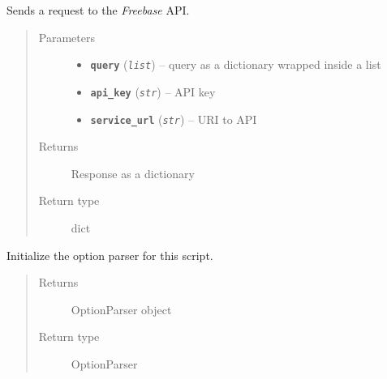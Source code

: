 \documentclass[letterpaper,10pt,english]{sphinxmanual}
\begin{document}

\begin{fulllineitems}
\label{src.prep.relations:src.prep.relations.relations.freebase_request}
Sends a request to the \emph{Freebase} API.
\begin{quote}\begin{description}
\item[{Parameters}] \leavevmode\begin{itemize}
\item {} 
\textbf{\texttt{query}} (\emph{\texttt{list}}) --  query as a dictionary wrapped inside a list

\item {} 
\textbf{\texttt{api\_key}} (\emph{\texttt{str}}) -- API key

\item {} 
\textbf{\texttt{service\_url}} (\emph{\texttt{str}}) -- URI to API

\end{itemize}

\item[{Returns}] \leavevmode
Response as a dictionary

\item[{Return type}] \leavevmode
dict

\end{description}\end{quote}

\end{fulllineitems}


\begin{fulllineitems}
\label{src.prep.relations:src.prep.relations.relations.init_optparser}
Initialize the option parser for this script.
\begin{quote}\begin{description}
\item[{Returns}] \leavevmode
OptionParser object

\item[{Return type}] \leavevmode
OptionParser

\end{description}\end{quote}

\end{fulllineitems}
\end{document}
